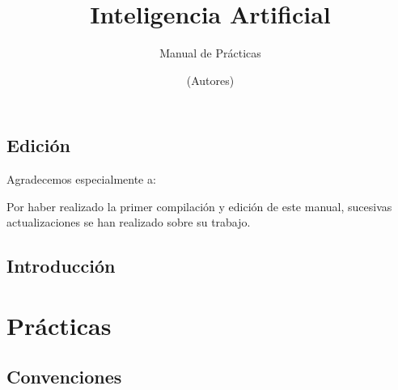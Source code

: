 \documentclass[12pt,openany]{book}
\title{Inteligencia Artificial}
\subtitle{Manual de Prácticas}
\author{
  (Autores)
}
\begin{document}
\maketitle

\chapter*{Edición}


Agradecemos especialmente a:

 
Por haber realizado la primer compilación y edición de este manual, sucesivas actualizaciones se han realizado sobre su trabajo.



\frontmatter %
\tableofcontents
\clearemptydoublepage %

\listofauxcodes


\mainmatter  %


\chapter*{Introducción}




\part{Prácticas}


\chapter*{Convenciones}
\end{document}
